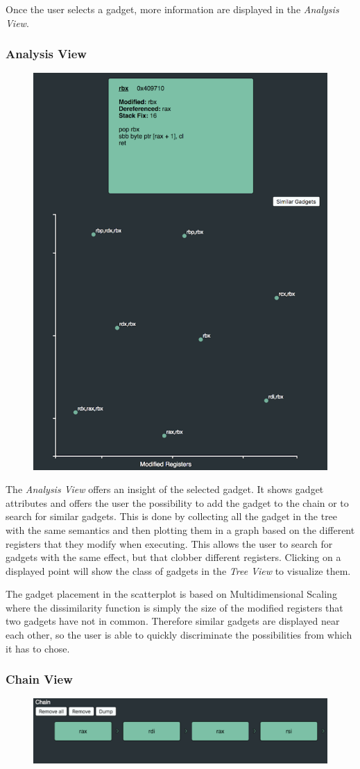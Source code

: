 \documentclass[twocolumn, 11pt]{article}
\begin{document}
Once the user selects a gadget, more information are displayed in the \textit{Analysis View}.

\subsubsection{Analysis View}
\begin{figure}[htb]
  \centering
  \includegraphics[width=0.6\linewidth]{analysis-view}
\end{figure}

The \textit{Analysis View} offers an insight of the selected gadget. It shows gadget attributes and offers the user the possibility to add the gadget to the chain or to search for similar gadgets. This is done by collecting all the gadget in the tree with the same semantics and then plotting them in a graph based on the different registers that they modify when executing. This allows the user to search for gadgets with the same effect, but that clobber different registers. Clicking on a displayed point will show the class of gadgets in the \textit{Tree View} to visualize them.

The gadget placement in the scatterplot is based on Multidimensional Scaling where the dissimilarity function is simply the size of the modified registers that two gadgets have not in common. Therefore similar gadgets are displayed near each other, so the user is able to quickly discriminate the possibilities from which it has to chose.

\subsubsection{Chain View}
\begin{figure}[htb]
  \centering
  \includegraphics[width=0.7\linewidth]{chain-view}
\end{figure}
\end{document}
